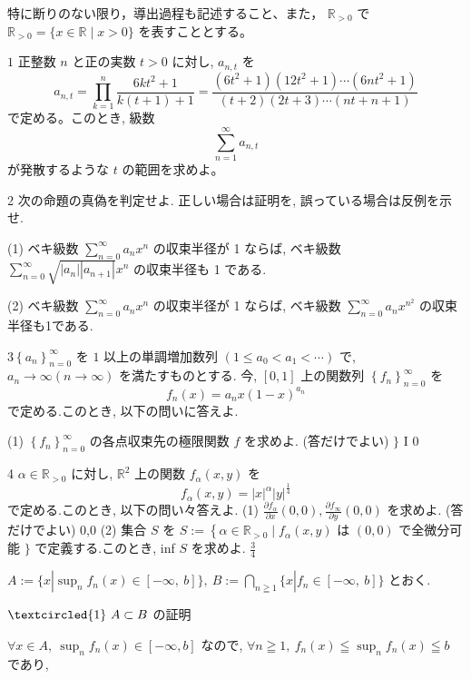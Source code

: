 \documentclass[dvipdfmx]{jsarticle}
\begin{document}
特に断りのない限り，導出過程も記述すること、また， $\mathbb{R}_{>0}$ で $\mathbb{R}_{>0}=\{x \in \mathbb{R} \mid x>0\}$ を表すこととする。

$1$ 正整数 $n$ と正の実数 $t>0$ に対し, $a_{n, t}$ を
$$
a_{n, t}=\prod_{k=1}^n \frac{6 k t^2+1}{k(t+1)+1}=\frac{\left(6 t^2+1\right)\left(12 t^2+1\right) \cdots\left(6 n t^2+1\right)}{(t+2)(2 t+3) \cdots(n t+n+1)}
$$
で定める。このとき, 級数
$$
\sum_{n=1}^{\infty} a_{n, t}
$$
が発散するような $t$ の範囲を求めよ。

2 次の命題の真偽を判定せよ. 正しい場合は証明を, 誤っている場合は反例を示せ.

(1) ベキ級数 $\sum_{n=0}^{\infty} a_n x^n$ の収束半径が 1 ならば, ベキ級数 $\sum_{n=0}^{\infty} \sqrt{\left|a_n\right|\left|a_{n+1}\right|} x^n$ の収束半径も 1 である.

(2) ベキ級数 $\sum_{n=0}^{\infty} a_n x^n$ の収束半径が 1 ならば, ベキ級数 $\sum_{n=0}^{\infty} a_n x^{n^2}$ の収束半径も1である.

$3\left\{a_n\right\}_{n=0}^{\infty}$ を $1$ 以上の単調増加数列 
$\left(1 \leq a_0<a_1<\cdots\right)$ で, $a_n \rightarrow \infty(n \rightarrow \infty)$ を満たすものとする. 今, $[0,1]$ 上の関数列 $\left\{f_n\right\}_{n=0}^{\infty}$ を
$$
f_n(x)=a_n x(1-x)^{a_n}
$$
で定める.このとき, 以下の問いに答えよ.

(1) $\left\{f_n\right\}_{n=0}^{\infty}$ の各点収束先の極限関数 $f$ を求めよ. (答だけでよい) $\}$ I 0

4 $\alpha \in \mathbb{R}_{>0}$ に対し, $\mathbb{R}^2$ 上の関数 $f_\alpha(x, y)$ を
$$
f_\alpha(x, y)=|x|^\alpha|y|^{\frac{1}{4}}
$$
で定める.このとき, 以下の問い々答えよ.
(1) $\frac{\partial f_\alpha}{\partial x}(0,0), \frac{\partial f_{\infty}}{\partial y}(0,0)$ を求めよ. (答だけでよい) 0,0
(2) 集合 $S$ を $S:=\left\{\alpha \in \mathbb{R}_{>0} \mid f_\alpha(x, y)\right.$ は $(0,0)$ で全微分可能 $\}$ で定義する.このとき, inf $S$ を求めよ. $\frac{3}{4}$

\bigskip
\bigskip
\bigskip
\bigskip

$A:= \displaystyle \{x | \sup_n f_n (x) \in [-\infty, \ b] \}, \ 
B := \displaystyle \bigcap_{n \geqq 1} \{x | f_n \in [-\infty, \ b] \}$ とおく.

\bigskip

$\textcircled{\scriptsize 1} \ A \subset B$ の証明

$\forall x \in A, \ \displaystyle \sup_n f_n (x) \in [-\infty, b]$ なので, $\displaystyle \forall n \geqq 1, \ f_n (x) \leqq \sup_n f_n (x) \leqq b$ であり, 
\end{document}
